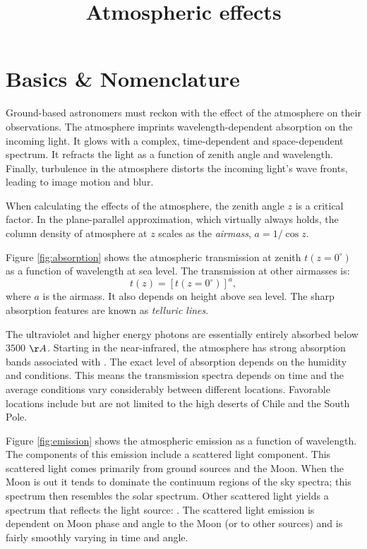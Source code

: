 \title{\bf Atmospheric effects}

\section{Basics \& Nomenclature}

Ground-based astronomers must reckon with the effect of the atmosphere
on their observations. The atmosphere imprints wavelength-dependent
absorption on the incoming light. It glows with a complex,
time-dependent and space-dependent spectrum.  It refracts the light as
a function of zenith angle and wavelength. Finally, turbulence in the
atmosphere distorts the incoming light's wave fronts, leading to image
motion and blur.

When calculating the effects of the atmosphere, the zenith angle $z$
is a critical factor. In the plane-parallel approximation, which
virtually always holds, the column density of atmosphere at $z$ scales
as the {\it airmass}, $a = 1 / \cos z$. 

Figure \ref{fig:absorption} shows the atmospheric transmission at
zenith $t(z=0^\circ)$ as a function of wavelength at sea level. The
transmission at other airmasses is:
\begin{equation}
t(z) = [t(z=0^\circ)]^a,
\end{equation}
where $a$ is the airmass. It also depends on height above sea level.
The sharp absorption features are known as {\it telluric lines}.

The ultraviolet and higher energy photons are essentially entirely
absorbed below $3500$ $\AA$. Starting in the near-infrared, the
atmosphere has strong absorption bands associated with .
The exact level of absorption depends on the humidity and
conditions. This means the transmission spectra depends on time and
the average conditions vary considerably between different
locations. Favorable locations include but are not limited to the high
deserts of Chile and the South Pole.

Figure \ref{fig:emission} shows the atmospheric emission as a function
of wavelength. The components of this emission include a scattered
light component. This scattered light comes primarily from ground
sources and the Moon. When the Moon is out it tends to dominate the
continuum regions of the sky spectra; this spectrum then resembles the
solar spectrum. Other scattered light yields a spectrum that reflects
the light source: . The scattered light emission is
dependent on Moon phase and angle to the Moon (or to other sources)
and is fairly smoothly varying in time and angle.

